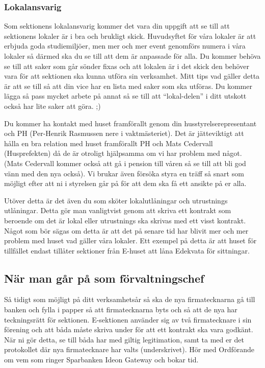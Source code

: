 \documentclass[10pt]{article}
\begin{document}
\subsubsection{Lokalansvarig}
Som sektionens lokalansvarig kommer det vara din uppgift att se till att sektionens lokaler är i bra och brukligt skick. Huvudsyftet för våra lokaler är att erbjuda goda studiemiljöer, men mer och mer event genomförs numera i våra lokaler så därmed ska du se till att dem är anpassade för alla. 
Du kommer behöva se till att saker som går sönder fixas och att lokalen är i det skick den behöver vara för att sektionen ska kunna utföra sin verksamhet. Mitt tips vad gäller detta är att se till så att din vice har en lista med saker som ska utföras. Du kommer lägga så pass mycket arbete på annat så se till att “lokal-delen” i ditt utskott också har lite saker att göra. ;)

Du kommer ha kontakt med huset framförallt genom din husstyrelserepresentant och PH (Per-Henrik Rasmussen nere i vaktmästeriet). Det är jätteviktigt att hålla en bra relation med huset framförallt PH och Mats Cedervall (Husprefekten) då de är otroligt hjälpsamma om vi har problem med något. (Mats Cedervall kommer också att gå i pension till våren så se till att bli god vänn med den nya också). Vi brukar även försöka styra en träff så snart som möjligt efter att ni i styrelsen går på för att dem ska få ett ansikte på er alla.

Utöver detta är det även du som sköter lokalutlåningar och utrustnings utlåningar. Detta gör man vanligtvist genom att skriva ett kontrakt som beroende om det är lokal eller utrustnings ska skrivas med ett visst kontrakt. 
Något som bör sägas om detta är att det på senare tid har blivit mer och mer problem med huset vad gäller våra lokaler. Ett exempel på detta är att huset för tillfället endast tillåter sektioner från E-huset att låna Edekvata för sittningar. 

\subsection{När man går på som förvaltningschef}
Så tidigt som möjligt på ditt verksamhetsår så ska de nya firmatecknarna gå till banken och fylla i papper så att firmatecknarna byts och så att de nya har teckningsrätt för sektionen. E-sektionen använder sig av två firmatecknare i sin förening och att båda måste skriva under för att ett kontrakt ska vara godkänt. 
När ni gör detta, se till båda har med giltig legitimation, samt ta med er det protokollet där nya firmatecknare har valts (underskrivet). Hör med Ordförande om vem som ringer Sparbanken Ideon Gateway och bokar tid.
\end{document}
